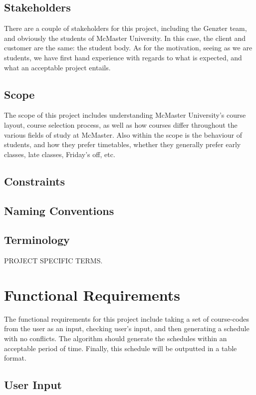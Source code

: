 \documentclass[12pt]{article}
\begin{document}
\subsection{Stakeholders}
There are a couple of stakeholders for this project, including the Genzter team, and obviously the students of McMaster University. In this case, the client and customer are the same: the student body. As for the motivation, seeing as we are students, we have first hand experience with regards to what is expected, and what an acceptable project entails.

\subsection{Scope}
The scope of this project includes understanding McMaster University's course layout, course selection process, as well as how courses differ throughout the various fields of study at McMaster. Also within the scope is the behaviour of students, and how they prefer timetables, whether they generally prefer early classes, late classes, Friday's off, etc. 

\subsection{Constraints}

\subsection{Naming Conventions}

\subsection{Terminology}
PROJECT SPECIFIC TERMS.
\newpage
\section{Functional Requirements}

\tab The functional requirements for this project include taking a set of course-codes from the user as an input, checking user's input, and then generating a schedule with no conflicts. The algorithm should generate the schedules within an acceptable period of time. Finally, this schedule will be outputted in a table format.

\subsection{User Input}
\end{document}
